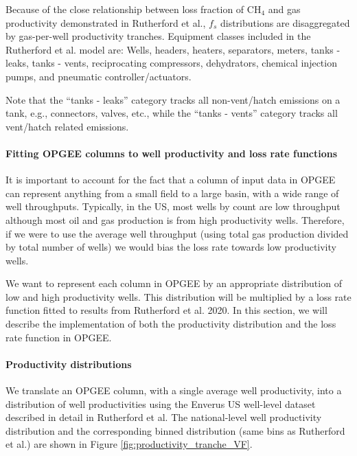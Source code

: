 \documentclass[11pt]{report}
\begin{document}
Because of the close relationship between loss fraction of CH$_4$ and gas productivity demonstrated in Rutherford et al., $f_s$ distributions are disaggregated by gas-per-well productivity tranches. Equipment classes included in the Rutherford et al. model are: Wells, headers, heaters, separators, meters, tanks - leaks, tanks - vents, reciprocating compressors, dehydrators, chemical injection pumps, and pneumatic controller/actuators. 

Note that the ``tanks - leaks'' category tracks all non-vent/hatch emissions on a tank, e.g., connectors, valves, etc., while the ``tanks - vents'' category tracks all vent/hatch related emissions.

\paragraph{Fitting OPGEE columns to well productivity and loss rate functions}

It is important to account for the fact that a column of input data in OPGEE can represent anything from a small field to a large basin, with a wide range of well throughputs. Typically, in the US, most wells by count are low throughput although most oil and gas production is from high productivity wells. Therefore, if we were to use the average well throughput (using total gas production divided by total number of wells) we would bias the loss rate towards low productivity wells.

We want to represent each column in OPGEE by an appropriate distribution of low and high productivity wells. This distribution will be multiplied by a loss rate function fitted to results from Rutherford et al. 2020. In this section, we will describe the implementation of both the productivity distribution and the loss rate function in OPGEE.

\paragraph{Productivity distributions}

We translate an OPGEE column, with a single average well productivity, into a distribution of well productivities using the Enverus US well-level dataset described in detail in Rutherford et al. The national-level well productivity distribution and the corresponding binned distribution (same bins as Rutherford et al.) are shown in Figure \ref{fig:productivity_tranche_VF}.
\end{document}
